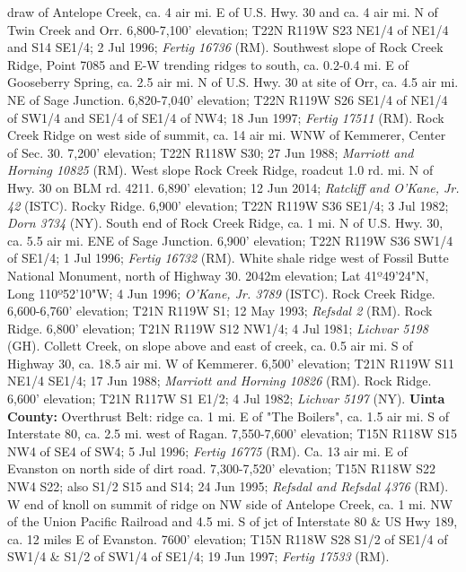 draw of Antelope Creek, ca. 4 air mi. E of U.S. Hwy. 30 and ca. 4 air mi. N of
Twin Creek and Orr. 6,800-7,100' elevation; T22N R119W S23 NE1/4 of NE1/4 and
S14 SE1/4; 2 Jul 1996; \textit{Fertig 16736} (RM).
Southwest slope of Rock Creek Ridge, Point 7085 and E-W trending ridges to
south, ca. 0.2-0.4 mi. E of Gooseberry Spring, ca. 2.5 air mi. N of U.S. Hwy. 30
at site of Orr, ca. 4.5 air mi. NE of Sage Junction. 6,820-7,040' elevation;
T22N R119W S26 SE1/4 of NE1/4 of SW1/4 and SE1/4 of SE1/4 of NW4; 18 Jun 1997;
\textit{Fertig 17511} (RM).
Rock Creek Ridge on west side of summit, ca. 14 air mi. WNW of Kemmerer,
Center of Sec. 30. 7,200' elevation; T22N R118W S30; 27 Jun 1988;
\textit{Marriott and Horning 10825} (RM).
West slope Rock Creek Ridge, roadcut 1.0 rd. mi. N of Hwy. 30 on BLM rd. 4211.
6,890' elevation; 12 Jun 2014; \textit{Ratcliff and O'Kane, Jr. 42} (ISTC).
Rocky Ridge. 6,900' elevation; T22N R119W S36 SE1/4; 3 Jul 1982;
\textit{Dorn 3734} (NY).
South end of Rock Creek Ridge, ca. 1 mi. N of U.S. Hwy. 30, ca. 5.5 air mi.
ENE of Sage Junction. 6,900' elevation; T22N R119W S36 SW1/4 of SE1/4;
1 Jul 1996; \textit{Fertig 16732} (RM).
White shale ridge west of Fossil Butte National Monument, north of Highway 30.
2042m elevation; Lat 41º49'24"N, Long 110º52'10"W; 4 Jun 1996;
\textit{O'Kane, Jr. 3789} (ISTC).
Rock Creek Ridge. 6,600-6,760' elevation; T21N R119W S1; 12 May 1993;
\textit{Refsdal 2} (RM).
Rock Ridge. 6,800' elevation; T21N R119W S12 NW1/4; 4 Jul 1981;
\textit{Lichvar 5198} (GH).
Collett Creek, on slope above and east of creek, ca. 0.5 air mi. S of Highway
30, ca. 18.5 air mi. W of Kemmerer. 6,500' elevation; T21N R119W S11 NE1/4
SE1/4; 17 Jun 1988; \textit{Marriott and Horning 10826} (RM).
Rock Ridge. 6,600' elevation; T21N R117W S1 E1/2; 4 Jul 1982;
\textit{Lichvar 5197} (NY).
  \textbf{Uinta County:}
Overthrust Belt: ridge ca. 1 mi. E of "The Boilers", ca. 1.5 air mi. S of
Interstate 80, ca. 2.5 mi. west of Ragan. 7,550-7,600' elevation;
T15N R118W S15 NW4 of SE4 of SW4; 5 Jul 1996; \textit{Fertig 16775} (RM).
Ca. 13 air mi. E of Evanston on north side of dirt road. 7,300-7,520' elevation;
T15N R118W S22 NW4 S22; also S1/2 S15 and S14; 24 Jun 1995;
\textit{Refsdal and Refsdal 4376} (RM).
W end of knoll on summit of ridge on NW side of Antelope Creek, ca. 1 mi. NW of
the Union Pacific Railroad and 4.5 mi. S of jct of Interstate 80 & US Hwy 189,
ca. 12 miles E of Evanston. 7600' elevation;
T15N R118W S28 S1/2 of SE1/4 of SW1/4 & S1/2 of SW1/4 of SE1/4; 19 Jun 1997;
\textit{Fertig 17533} (RM).

